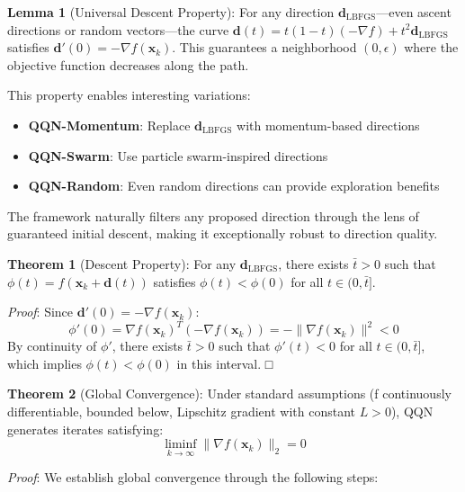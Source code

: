 \textbf{Lemma 1} (Universal Descent Property): For any direction \(\mathbf{d}_{\text{LBFGS}}\)---even ascent directions or
random vectors---the curve \(\mathbf{d}(t) = t(1-t)(-\nabla f) + t^2 \mathbf{d}_{\text{LBFGS}}\) satisfies
\(\mathbf{d}'(0) = -\nabla f(\mathbf{x}_k)\). This guarantees a neighborhood \((0, \epsilon)\) where the objective
function decreases along the path.

This property enables interesting variations:

\begin{itemize}
\tightlist
\item
  \textbf{QQN-Momentum}: Replace \(\mathbf{d}_{\text{LBFGS}}\) with momentum-based directions
\item
  \textbf{QQN-Swarm}: Use particle swarm-inspired directions
\item
  \textbf{QQN-Random}: Even random directions can provide exploration benefits
\end{itemize}

The framework naturally filters any proposed direction through the lens of guaranteed initial descent, making it
exceptionally robust to direction quality.

\textbf{Theorem 1} (Descent Property): For any \(\mathbf{d}_{\text{LBFGS}}\), there exists \(\bar{t} > 0\) such
that \(\phi(t) = f(\mathbf{x}_k + \mathbf{d}(t))\) satisfies \(\phi(t) < \phi(0)\) for all \(t \in (0, \bar{t}]\).

\emph{Proof}: Since \(\mathbf{d}'(0) = -\nabla f(\mathbf{x}_k)\):
\[\phi'(0) = \nabla f(\mathbf{x}_k)^T (-\nabla f(\mathbf{x}_k)) = -\|\nabla f(\mathbf{x}_k)\|^2 < 0\]
By continuity of \(\phi'\), there exists \(\bar{t} > 0\) such that \(\phi'(t) < 0\) for all \(t \in (0, \bar{t}]\), which implies \(\phi(t) < \phi(0)\) in this interval. □

\textbf{Theorem 2} (Global Convergence): Under standard assumptions (f continuously differentiable, bounded below, Lipschitz
gradient with constant \(L > 0\)), QQN generates iterates satisfying:
\[\liminf_{k \to \infty} \|\nabla f(\mathbf{x}_k)\|_2 = 0\]

\emph{Proof}: We establish global convergence through the following steps:

